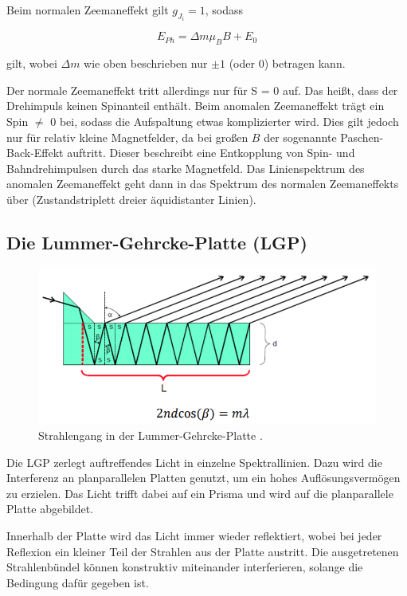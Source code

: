 Beim normalen Zeemaneffekt gilt $g_{J_i} = 1$, sodass

\begin{equation}
	E_{Ph} = \Delta m \mu_B B + E_0
\end{equation}

gilt, wobei $\Delta m$ wie oben beschrieben nur $\pm 1$ (oder 0) betragen kann.

Der normale Zeemaneffekt tritt allerdings nur für S = 0 auf. Das heißt, dass der Drehimpuls keinen Spinanteil enthält.
Beim anomalen Zeemaneffekt trägt ein Spin $\neq$ 0 bei, sodass die Aufspaltung etwas komplizierter wird.
Dies gilt jedoch nur für relativ kleine Magnetfelder, da bei großen $B$ der sogenannte Paschen-Back-Effekt auftritt.
Dieser beschreibt eine Entkopplung von Spin- und Bahndrehimpulsen durch das starke Magnetfeld. Das Linienspektrum des
anomalen Zeemaneffekt geht dann in das Spektrum des normalen Zeemaneffekts über (Zustandstriplett dreier äquidistanter
Linien).

\subsection{Die Lummer-Gehrcke-Platte (LGP)}

\begin{figure}
\centering
\includegraphics[width=\textwidth]{platte.png}
\caption{Strahlengang in der Lummer-Gehrcke-Platte \cite[2]{anleitung}.}
\label{fig:platte}
\end{figure}

Die LGP zerlegt auftreffendes Licht in einzelne Spektrallinien. Dazu wird die Interferenz an planparallelen Platten
genutzt, um ein hohes Auflösungsvermögen zu erzielen. Das Licht trifft dabei auf ein Prisma und wird auf die planparallele
Platte abgebildet.

Innerhalb der Platte wird das Licht immer wieder reflektiert, wobei bei jeder Reflexion ein kleiner Teil der Strahlen
aus der Platte austritt. Die ausgetretenen Strahlenbündel können konstruktiv miteinander interferieren, solange die Bedingung
dafür gegeben ist.

